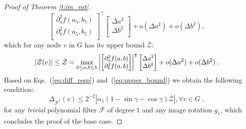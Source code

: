 \documentclass[10pt,journal,compsoc]{IEEEtran}
\newcommand{\hmF}{\hat{\mathcal{F}}}
\newcommand{\norm}[1]{\left|#1\right|}
\begin{document}
\begin{proof}[Proof of Theorem \ref{t:im_rot}]
\begin{equation}
\begin{bmatrix}
		\partial_a^2 f (a_5, b_5)\\
		\partial_b^2 f (a_5,b_5)\\
		\end{bmatrix}^{\intercal}
		\begin{bmatrix}
		\Delta a^2 \\
		\Delta b^2 \\
		\end{bmatrix} + o(\Delta a^2) + o(\Delta b^2),
		\label{eq:sec_der_base}
		\end{equation}
		\noindent
		which for any node $v$ in $G$ has its upper bound $\bar{\mathcal{Z}}$:
		\begin{equation}
		\small
		\norm{\mathcal{Z}(v)} \leq \bar{\mathcal{Z}} =
		\max_{0 \leq a,b \leq 1} \left|
		\begin{bmatrix}
		\partial_a^2 f (a,b)\\
		\partial_b^2 f (a,b)\\
		\end{bmatrix}
		\right|^{\intercal}
		\begin{bmatrix}
		\Delta a^2 \\
		\Delta b^2 \\
		\end{bmatrix} + o(\Delta a^2) + o(\Delta b^2) \;.
		\label{eq:upper_bound}
		\end{equation}
		\noindent
		Based on Eqs.~(\ref{eq:diff_resp}) and~(\ref{eq:upper_bound}) we obtain the following condition:
		\begin{equation}
		\Delta_{\hmF^1}(v) \leq 2^{-2}\norm{\alpha_1(1 - \sin\gamma - \cos\gamma) \bar{\mathcal{Z}}}, \forall v \in G \;,
		\label{eq:filt_rot_single_fin}
		\end{equation}
		\noindent
		for any \emph{trivial} polynomial filter $\mathcal{F}$ of degree $1$ and any image rotation $g_\gamma$, which concludes the proof of the base case.



\end{proof}
\end{document}
